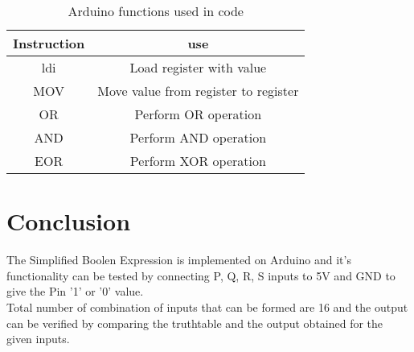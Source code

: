 \documentclass[journal,12pt,twocolumn]{IEEEtran}
\begin{document}
\begin{table}[h]
\centering
\begin{tabular}{|c|c|}
\hline
Instruction & use\\
\hline
ldi & Load register with value\\
\hline
MOV & Move value from register to register\\
\hline
OR & Perform OR operation\\
\hline 
AND & Perform AND operation \\
\hline
EOR & Perform XOR operation \\
\hline
\end{tabular}
\bigskip
\caption{Arduino functions used in code} 
\end{table}  

\section{Conclusion}
The Simplified Boolen Expression is implemented on Arduino and it's functionality can be tested by connecting P, Q, R, S inputs to 5V and GND to give the Pin '1' or '0' value.\\
Total number of combination of inputs that can be formed are 16 and the output can be verified by comparing the truthtable and the output obtained for the given inputs.
\end{document}
